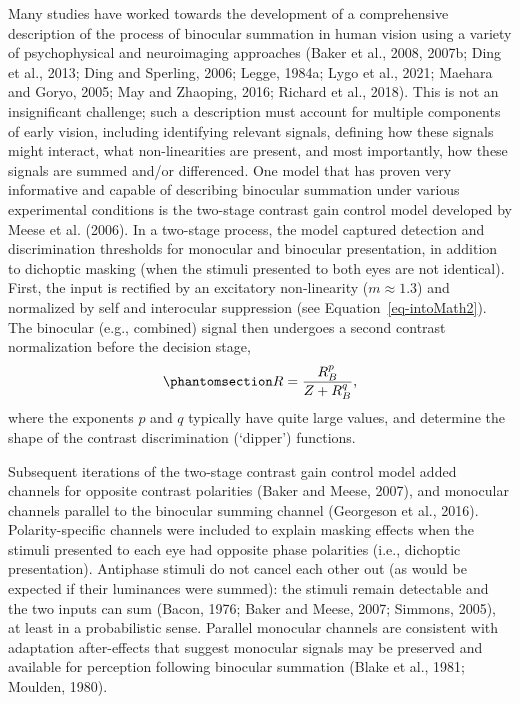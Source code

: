 \documentclass[
  12pt,
]{article}
\begin{document}
Many studies have worked towards the development of a comprehensive
description of the process of binocular summation in human vision using
a variety of psychophysical and neuroimaging approaches (Baker et al.,
2008, 2007b; Ding et al., 2013; Ding and Sperling, 2006; Legge, 1984a;
Lygo et al., 2021; Maehara and Goryo, 2005; May and Zhaoping, 2016;
Richard et al., 2018). This is not an insignificant challenge; such a
description must account for multiple components of early vision,
including identifying relevant signals, defining how these signals might
interact, what non-linearities are present, and most importantly, how
these signals are summed and/or differenced. One model that has proven
very informative and capable of describing binocular summation under
various experimental conditions is the two-stage contrast gain control
model developed by Meese et al. (2006). In a two-stage process, the
model captured detection and discrimination thresholds for monocular and
binocular presentation, in addition to dichoptic masking (when the
stimuli presented to both eyes are not identical). First, the input is
rectified by an excitatory non-linearity (\(m \approx 1.3\)) and
normalized by self and interocular suppression (see
Equation~\ref{eq-intoMath2}). The binocular (e.g., combined) signal then
undergoes a second contrast normalization before the decision stage,
\begin{equation}\phantomsection\label{eq-IntroMathSecondStage}{
R = \frac{R_B^p}{Z + R_B^q},
}\end{equation} where the exponents \(p\) and \(q\) typically have quite
large values, and determine the shape of the contrast discrimination
(`dipper') functions.

Subsequent iterations of the two-stage contrast gain control model added
channels for opposite contrast polarities (Baker and Meese, 2007), and
monocular channels parallel to the binocular summing channel (Georgeson
et al., 2016). Polarity-specific channels were included to explain
masking effects when the stimuli presented to each eye had opposite
phase polarities (i.e., dichoptic presentation). Antiphase stimuli do
not cancel each other out (as would be expected if their luminances were
summed): the stimuli remain detectable and the two inputs can sum
(Bacon, 1976; Baker and Meese, 2007; Simmons, 2005), at least in a
probabilistic sense. Parallel monocular channels are consistent with
adaptation after-effects that suggest monocular signals may be preserved
and available for perception following binocular summation (Blake et
al., 1981; Moulden, 1980).
\end{document}
